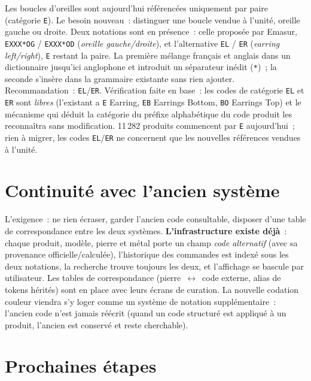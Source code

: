 \documentclass[11pt,a4paper]{article}
\newcommand{\code}[1]{\texttt{#1}}
\begin{document}
Les boucles d'oreilles sont aujourd'hui référencées uniquement par paire
(catégorie \code{E}). Le besoin nouveau~: distinguer une boucle vendue à
l'unité, oreille gauche ou droite. Deux notations sont en présence~: celle
proposée par Emasur, \code{EXXX*OG} / \code{EXXX*OD} (\emph{oreille
gauche/droite}), et l'alternative \code{EL} / \code{ER} (\emph{earring
left/right}), \code{E} restant la paire. La première mélange français et
anglais dans un dictionnaire jusqu'ici anglophone et introduit un
séparateur inédit (\code{*})~; la seconde s'insère dans la grammaire
existante sans rien ajouter. Recommandation~: \code{EL}/\code{ER}.
Vérification faite en base~: les codes de catégorie \code{EL} et \code{ER}
sont \emph{libres} (l'existant a \code{E} Earring, \code{EB} Earrings
Bottom, \code{BO} Earrings Top) et le mécanisme qui déduit la catégorie du
préfixe alphabétique du code produit les reconnaîtra sans modification.
11\,282 produits commencent par \code{E} aujourd'hui~; rien à migrer, les
codes \code{EL}/\code{ER} ne concernent que les nouvelles références vendues
à l'unité.

\section{Continuité avec l'ancien système}
\label{sec:continuite}

L'exigence~: ne rien écraser, garder l'ancien code consultable, disposer
d'une table de correspondance entre les deux systèmes. \textbf{L'infrastructure existe déjà}~:
chaque produit, modèle, pierre et métal porte un champ \emph{code alternatif}
(avec sa provenance officielle/calculée), l'historique des commandes est
indexé sous les deux notations, la recherche trouve toujours les deux, et
l'affichage se bascule par utilisateur. Les tables de correspondance
(pierre~$\leftrightarrow$~code externe, alias de tokens hérités) sont en
place avec leurs écrans de curation. La nouvelle codation couleur viendra
s'y loger comme un système de notation supplémentaire~: l'ancien code n'est
jamais réécrit (quand un code structuré est appliqué à un produit, l'ancien
est conservé et reste cherchable).

\section{Prochaines étapes}
\end{document}
